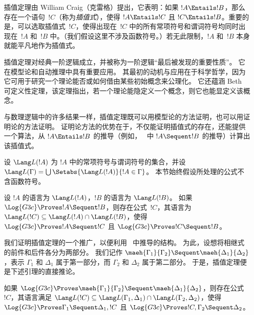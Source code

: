 \documentclass[../../../include/open-logic-section]{subfiles}
\begin{document}


插值定理由 William Craig（克雷格）提出，它表明：如果 $!A \Entails !B$，那么存在一个语句~$!C$（称为\emph{插值式}），使得 $!A \Entails !C$ 且 $!C \Entails !B$。重要的是，可以选取插值式~$!C$，使得出现在~$!C$ 中的所有常项符号和谓词符号均同时出现在~$!A$ 和~$!B$ 中。（我们假设这里不涉及函数符号。）若无此限制，$!A$ 和~$!B$ 本身就能平凡地作为插值式。

插值定理对经典一阶逻辑成立，并被称为一阶逻辑“最后被发现的重要性质”。
它在模型论和自动推理中具有重要应用。
其最初的动机与应用在于科学哲学，因为它可用于研究一个理论能否或如何借由某些初始概念来公理化。
它还蕴涵 Beth 可定义性定理，该定理指出，若一个理论能隐定义一个概念，则它也能显定义该概念。

与数理逻辑中的许多结果一样，插值定理既可以用模型论的方法证明，也可以用证明论的方法证明。
证明论方法的优势在于，不仅能证明插值式的存在，还能提供一个算法，从 $!A \Entails !B$ 的推导（例如，~ 中 $!A \Sequent !B$ 的推导）计算出该插值式。

设 $\Lang L(!A)$ 为 $!A$ 中的常项符号与谓词符号的集合，并设 $\Lang L(\Gamma) = \bigcup \Setabs{\Lang L(!A)}{!A \in
\Gamma}$。
本节始终假设所处理的公式不含函数符号。

\begin{thm}
设 $!A$ 的语言为 $\Lang L(!A)$，$!B$ 的语言为 $\Lang L(!B)$。
如果 $\Log{G3c} \Proves !A \Sequent !B$，则存在公式~$!C$，其语言为 $\Lang L(!C) \subseteq \Lang
L(!A) \cap \Lang L(!B)$，使得 $\Log{G3c} \Proves !A \Sequent !C$ 且 $\Log{G3c} \Proves !C \Sequent !B$。
\end{thm}

我们证明插值定理的一个推广，以便利用~ 中推导的结构。
为此，设想将相继式的前件和后件各分为两部分。
我们记作 $\maeh{\Gamma_1}{\Gamma_2} \Sequent
\maeh{\Delta_1}{\Delta_2}$，表示 $\Gamma_1$ 和 $\Delta_1$ 属于第一部分，而 $\Gamma_2$ 和 $\Delta_2$ 属于第二部分。
于是，插值定理便是下述引理的直接推论。

\begin{lem}[Maehara 引理]
如果 $\Log{G3c}
\Proves \maeh{\Gamma_1}{\Gamma_2} \Sequent \maeh{\Delta_1}{\Delta_2}$，则存在公式~$!C$，其语言满足 $\Lang L(!C)
\subseteq \Lang L(\Gamma_1,
\Delta_1) \cap \Lang L(\Gamma_2, \Delta_2)$，使得 $\Log{G3c}
\Proves \Gamma_1 \Sequent \Delta_1, !C$ 且 $\Log{G3c} \Proves !C,
\Gamma_2 \Sequent \Delta_2$。
\end{lem}
\end{document}
